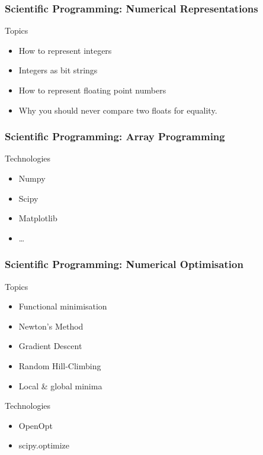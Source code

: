 \begin{frame}[fragile]
\frametitle{Scientific Programming: Numerical Representations}
\begin{block}{Topics}
\begin{itemize}
\item How to represent integers
\item Integers as bit strings
\item How to represent floating point numbers
\item Why you should never compare two floats for equality.
\end{itemize}
\end{block}
\end{frame}

\begin{frame}[fragile]
\frametitle{Scientific Programming: Array Programming}

\begin{block}{Technologies}
\begin{itemize}
\item Numpy
\item Scipy
\item Matplotlib
\item \ldots
\end{itemize}
\end{block}
\end{frame}

\begin{frame}[fragile]
\frametitle{Scientific Programming: Numerical Optimisation}

\begin{block}{Topics}
\begin{itemize}
\item Functional minimisation
\item Newton's Method
\item Gradient Descent
\item Random Hill-Climbing
\item Local \& global minima
\end{itemize}
\end{block}

\begin{block}{Technologies}
\begin{itemize}
\item OpenOpt
\item scipy.optimize
\end{itemize}
\end{block}
\end{frame}

